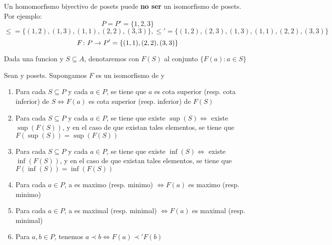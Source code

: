 \begin{remark}
  Un homomorfismo biyectivo de posets puede \textbf{no ser} un isomorfismo de posets. Por ejemplo:
  $$
  P = P' = \{1, 2, 3\}
  $$
  $$
  \leq = \{(1, 2), (1, 3), (1, 1), (2, 2), (3, 3)\}, \leq' = \{(1, 2), (2, 3), (1, 3), (1, 1), (2, 2), (3, 3)\}
  $$
  $$
  F\colon P\rightarrow P' = \{(1, 1), (2, 2), (3, 3)\}
  $$
\end{remark}

\begin{definition}
  Dada una funcion  y $S \subseteq A$, denotaremos con $F(S)$ al conjunto ${\{F(a) : a \in S\}}$
\end{definition}

\begin{lemma}
  Sean \poset y  posets. Supongamos $F$ es un isomorfismo de \poset y 
  \begin{enumerate}
    \item Para cada $S \subseteq P$ y cada $a \in P$, se tiene que $a$ es cota superior (resp. cota inferior) de $S \iff F(a)$
    es cota superior (resp. inferior) de $F(S)$
    \item Para cada $S \subseteq P$ y cada $a \in P$, se tiene que existe $\sup(S) \iff$ existe $\sup(F(S))$,
    y en el caso de que existan tales elementos, se tiene que $F(\sup(S)) = \sup(F(S))$
    \item Para cada $S \subseteq P$ y cada $a \in P$, se tiene que existe $\inf(S) \iff$ existe $\inf(F(S))$,
    y en el caso de que existan tales elementos, se tiene que $F(\inf(S)) = \inf(F(S))$
    \item Para cada $a \in P$, a es maximo (resp. minimo) $\iff F(a)$ es maximo (resp. minimo)
    \item Para cada $a \in P$, a es maximal (resp. minimal) $\iff F(a)$ es maximal (resp. minimal)
    \item Para $a, b \in P$, tenemos $a \prec b  \iff F(a) \prec' F(b)$
  \end{enumerate}
\end{lemma}
